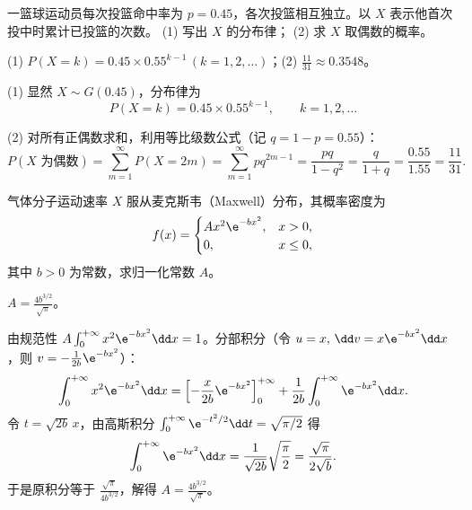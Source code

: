 \begin{exercise}[title={几何分布与偶次成功概率},level=standard,points=8,tags={几何分布,级数求和}]
一篮球运动员每次投篮命中率为 $p=0.45$，各次投篮相互独立。以 $X$ 表示他首次投中时累计已投篮的次数。
(1) 写出 $X$ 的分布律；
(2) 求 $X$ 取偶数的概率。
\begin{answer}
(1) $P(X=k)=0.45\times 0.55^{k-1}\,(k=1,2,\ldots)$；(2) $\frac{11}{31}\approx 0.3548$。
\end{answer}
\begin{solution}
(1) 显然 $X\sim G(0.45)$，分布律为
\[
  P(X=k)=0.45\times 0.55^{k-1},\qquad k=1,2,\ldots
\]

(2) 对所有正偶数求和，利用等比级数公式（记 $q=1-p=0.55$）：
\[
  P(X\text{ 为偶数})=\sum_{m=1}^{\infty}P(X=2m)
  =\sum_{m=1}^{\infty}pq^{2m-1}
  =\frac{pq}{1-q^2}
  =\frac{q}{1+q}
  =\frac{0.55}{1.55}=\frac{11}{31}.
\]
\end{solution}
\end{exercise}

\begin{exercise}[title={麦克斯韦速度分布的归一化},level=standard,points=8,tags={概率密度,广义积分}]
气体分子运动速率 $X$ 服从麦克斯韦（Maxwell）分布，其概率密度为
\[
  f(x)=
  \begin{cases}
    Ax^2\e^{-bx^2},& x>0,\\
    0,& x\le 0,
  \end{cases}
\]
其中 $b>0$ 为常数，求归一化常数 $A$。
\begin{answer}
$A=\frac{4b^{3/2}}{\sqrt{\pi}}$。
\end{answer}
\begin{solution}
由规范性 $A\int_{0}^{+\infty}x^2\e^{-bx^2}\dd x=1$。分部积分（令 $u=x,\,\dd v=x\e^{-bx^2}\dd x$，则 $v=-\frac{1}{2b}\e^{-bx^2}$）：
\[
  \int_{0}^{+\infty}x^2\e^{-bx^2}\dd x
  =\left[-\frac{x}{2b}\e^{-bx^2}\right]_{0}^{+\infty}
  +\frac{1}{2b}\int_{0}^{+\infty}\e^{-bx^2}\dd x.
\]
令 $t=\sqrt{2b}\,x$，由高斯积分 $\int_{0}^{+\infty}\e^{-t^2/2}\dd t=\sqrt{\pi/2}$ 得
\[
  \int_{0}^{+\infty}\e^{-bx^2}\dd x=\frac{1}{\sqrt{2b}}\sqrt{\frac{\pi}{2}}=\frac{\sqrt{\pi}}{2\sqrt{b}}.
\]
于是原积分等于 $\frac{\sqrt{\pi}}{4b^{3/2}}$，解得 $A=\frac{4b^{3/2}}{\sqrt{\pi}}$。
\end{solution}
\end{exercise}

